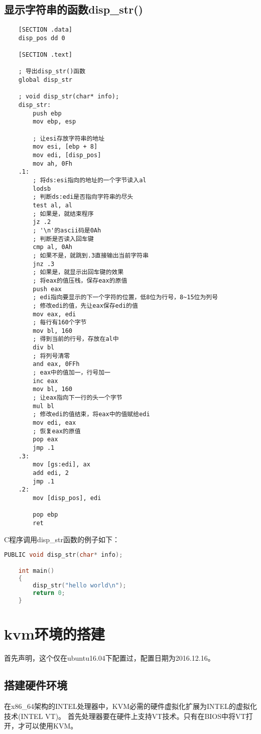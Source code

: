 \documentclass[a4paper,left=2.5cm,right=2.5cm,11pt]{article}
\begin{document}
\subsection{显示字符串的函数disp\_str()}
	\begin{lstlisting}
	[SECTION .data]
	disp_pos dd 0

	[SECTION .text]

	; 导出disp_str()函数
	global disp_str

	; void disp_str(char* info);
	disp_str:
		push ebp
		mov ebp, esp

		; 让esi存放字符串的地址
		mov esi, [ebp + 8]
		mov edi, [disp_pos]
		mov ah, 0Fh
	.1:
		; 将ds:esi指向的地址的一个字节读入al
		lodsb
		; 判断ds:edi是否指向字符串的尽头
		test al, al
		; 如果是，就结束程序
		jz .2
		; '\n'的ascii码是0Ah
		; 判断是否读入回车键
		cmp al, 0Ah
		; 如果不是，就跳到.3直接输出当前字符串
		jnz .3
		; 如果是，就显示出回车键的效果
		; 将eax的值压栈，保存eax的原值
		push eax
		; edi指向要显示的下一个字符的位置，低8位为行号，8~15位为列号
		; 修改edi的值，先让eax保存edi的值
		mov eax, edi
		; 每行有160个字节
		mov bl, 160
		; 得到当前的行号，存放在al中
		div bl
		; 将列号清零
		and eax, 0FFh
		; eax中的值加一，行号加一
		inc eax
		mov bl, 160
		; 让eax指向下一行的头一个字节
		mul bl
		; 修改edi的值结束，将eax中的值赋给edi
		mov edi, eax
		; 恢复eax的原值
		pop eax
		jmp .1
	.3:
		mov [gs:edi], ax
		add edi, 2
		jmp .1
	.2:
		mov [disp_pos], edi

		pop ebp
		ret
	\end{lstlisting}

	C程序调用disp\_str函数的例子如下：

	\begin{lstlisting}[language = C]
	PUBLIC void disp_str(char* info);

	int main()
	{
		disp_str("hello world\n");
		return 0;
	}
	\end{lstlisting}

 \clearpage

\section{kvm环境的搭建}
	首先声明，这个仅在ubuntu16.04下配置过，配置日期为2016.12.16。

\subsection{搭建硬件环境}
	在x86\_64架构的INTEL处理器中，KVM必需的硬件虚拟化扩展为INTEL的虚拟化技术(INTEL VT)。
	首先处理器要在硬件上支持VT技术。只有在BIOS中将VT打开，才可以使用KVM。
\end{document}
